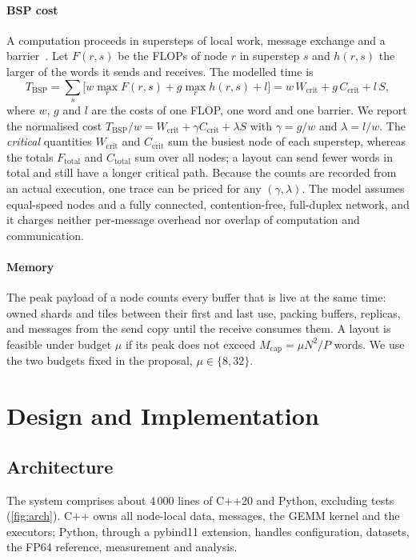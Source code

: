 \documentclass[11pt,a4paper]{article}
\newcommand{\Ccrit}{C_{\mathrm{crit}}}
\newcommand{\Ctot}{C_{\mathrm{total}}}
\newcommand{\Wcrit}{W_{\mathrm{crit}}}
\newcommand{\Ftot}{F_{\mathrm{total}}}
\begin{document}
\paragraph{BSP cost}
A computation proceeds in supersteps of local work, message exchange and a barrier~\cite{valiant1990,hill1998}.
Let $F(r,s)$ be the FLOPs of node $r$ in superstep $s$ and $h(r,s)$ the larger of the words it sends and
receives. The modelled time is
\begin{equation}
T_{\mathrm{BSP}} = \sum_s\Big[w\max_r F(r,s) + g\max_r h(r,s) + l\Big] = w\,\Wcrit + g\,\Ccrit + l\,S,
\label{eq:bsp}
\end{equation}
where $w$, $g$ and $l$ are the costs of one FLOP, one word and one barrier. We report the normalised cost
$T_{\mathrm{BSP}}/w=\Wcrit+\gamma\Ccrit+\lambda S$ with $\gamma=g/w$ and $\lambda=l/w$. The \emph{critical}
quantities $\Wcrit$ and $\Ccrit$ sum the busiest node of each superstep, whereas the totals $\Ftot$ and
$\Ctot$ sum over all nodes; a layout can send fewer words in total and still have a longer critical path.
Because the counts are recorded from an actual execution, one trace can be priced for any $(\gamma,\lambda)$.
The model assumes equal-speed nodes and a fully connected, contention-free, full-duplex network, and it
charges neither per-message overhead nor overlap of computation and communication.

\paragraph{Memory}
The peak payload of a node counts every buffer that is live at the same time: owned shards and tiles
between their first and last use, packing buffers, replicas, and messages from the send copy until the
receive consumes them. A layout is feasible under budget $\mu$ if its peak does not exceed
$M_{\mathrm{cap}}=\mu N^2/P$ words. We use the two budgets fixed in the proposal, $\mu\in\{8,32\}$.

\section{Design and Implementation}
\label{sec:impl}

\subsection{Architecture}

The system comprises about 4\,000 lines of C++20 and Python, excluding tests (\cref{fig:arch}). C++ owns
all node-local data, messages, the GEMM kernel and the executors; Python, through a pybind11 extension,
handles configuration, datasets, the FP64 reference, measurement and analysis.
\end{document}
